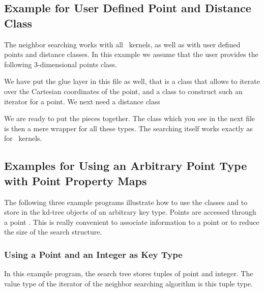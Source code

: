 \newpage
\subsection{Example for User Defined Point and Distance Class}

The neighbor searching works with all \cgal\ kernels, as well as with
user defined points and distance classes.
In this example we assume that the user provides the following 3-dimensional 
points class.


We have put the glue layer in this file as well, that is a class that allows to 
iterate over the Cartesian coordinates of the point, and a class to construct
such an iterator for a point. We next need a distance class
\newpage
{}

\newpage

We are ready to put the pieces together.
The class  which you see in the next file is then a mere 
wrapper for all these types.  The searching itself works exactly as for \cgal\ kernels.


\newpage
\subsection{Examples for Using an Arbitrary Point Type with Point Property Maps}
The following three example programs illustrate how to use the classes  and
 to store in the kd-tree objects of an arbitrary key type. Points are
accessed through a point .
This is really convenient to associate information to a point or to reduce the size of the search structure.

\subsubsection{Using a Point and an Integer as Key Type}
In this example program, the search tree stores tuples of point and integer.
The value type of the iterator of the neighbor searching algorithm is this tuple type.


